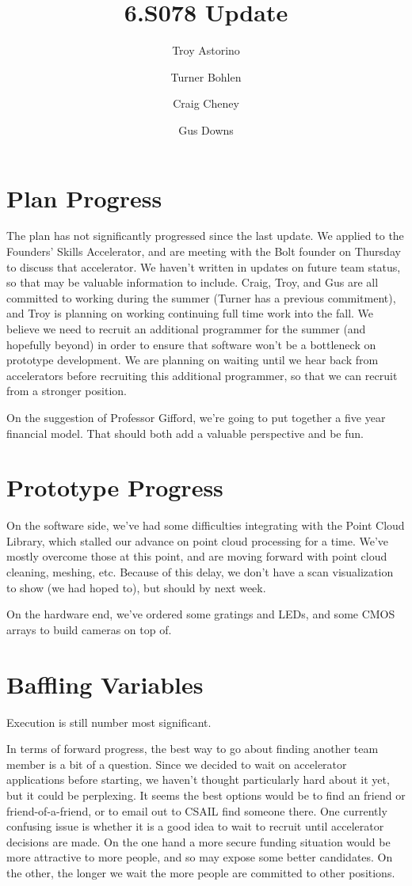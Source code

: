 \documentclass[10pt]{article}
\title{\vspace{-4em}6.S078 Update}
\author{Troy Astorino \and Turner Bohlen \and Craig Cheney \and Gus Downs}
\begin{document}
\maketitle
\vspace{-4em}

\section{Plan Progress}
The plan has not significantly progressed since the last update. We applied to
the Founders' Skills Accelerator, and are meeting with the Bolt founder on
Thursday to discuss that accelerator. We haven't written in updates on future
team status, so that may be valuable information to include. Craig, Troy, and
Gus are all committed to working during the summer (Turner has a previous
commitment), and Troy is planning on working continuing full time work into the
fall.  We believe we need to recruit an additional programmer for the summer
(and hopefully beyond) in order to ensure that software won't be a bottleneck on
prototype development. We are planning on waiting until we hear back from
accelerators before recruiting this additional programmer, so that we can
recruit from a stronger position.

On the suggestion of Professor Gifford, we're going to put together a five year
financial model.  That should both add a valuable perspective and be fun.

\section{Prototype Progress}
On the software side, we've had some difficulties integrating with the Point
Cloud Library, which stalled our advance on point cloud processing for a time.
We've mostly overcome those at this point, and are moving forward with point
cloud cleaning,  meshing, etc. Because of this delay, we don't have a scan
visualization to show (we had hoped to), but should by next week.

On the hardware end, we've ordered some gratings and LEDs, and some CMOS arrays
to build cameras on top of.

\section{Baffling Variables}
Execution is still number most significant.

In terms of forward progress, the best way to go about finding another team
member is a bit of a question. Since we decided to wait on accelerator
applications before starting, we haven't thought particularly hard about it yet,
but it could be perplexing. It seems the best options would be to find an friend
or friend-of-a-friend, or to email out to CSAIL find someone there. One
currently confusing issue is whether it is a good idea to wait to recruit until accelerator
decisions are made. On the one hand a more secure funding situation would be
more attractive to more people, and so may expose some better candidates. On the
other, the longer we wait the more people are committed to other
positions. 
\end{document}
